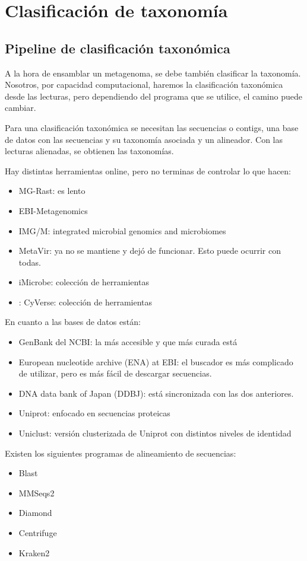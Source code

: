 \chapter{Clasificación de taxonomía}
\section{Pipeline de clasificación taxonómica}
A la hora de ensamblar un metagenoma, se debe también clasificar la taxonomía. Nosotros, por capacidad computacional, haremos la clasificación taxonómica desde las lecturas, pero dependiendo del programa que se utilice, el camino puede cambiar. 

Para una clasificación taxonómica se necesitan las secuencias o contigs, una base de datos con las secuencias y su taxonomía asociada y un alineador. Con las lecturas alienadas, se obtienen las taxonomías. 

Hay distintas herramientas online, pero no terminas de controlar lo que hacen:
\begin{itemize}
\item MG-Rast: es lento
\item EBI-Metagenomics
\item IMG/M: integrated microbial genomics and microbiomes
\item MetaVir: ya no se mantiene y dejó de funcionar. Esto puede ocurrir con todas.
\item iMicrobe: colección de herramientas
\item: CyVerse: colección de herramientas
\end{itemize}

En cuanto a las bases de datos están:
\begin{itemize}
\item GenBank del NCBI: la más accesible y que más curada está
\item European nucleotide archive (ENA) at EBI: el buscador es más complicado de utilizar, pero es más fácil de descargar secuencias.
\item DNA data bank of Japan (DDBJ): está sincronizada con las dos anteriores.
\item Uniprot: enfocado en secuencias proteicas
\item Uniclust: versión clusterizada de Uniprot con distintos niveles de identidad
\end{itemize}

Existen los siguientes programas de alineamiento de secuencias:
\begin{itemize}
\item Blast
\item MMSeqs2
\item Diamond
\item Centrifuge
\item Kraken2
\end{itemize}

